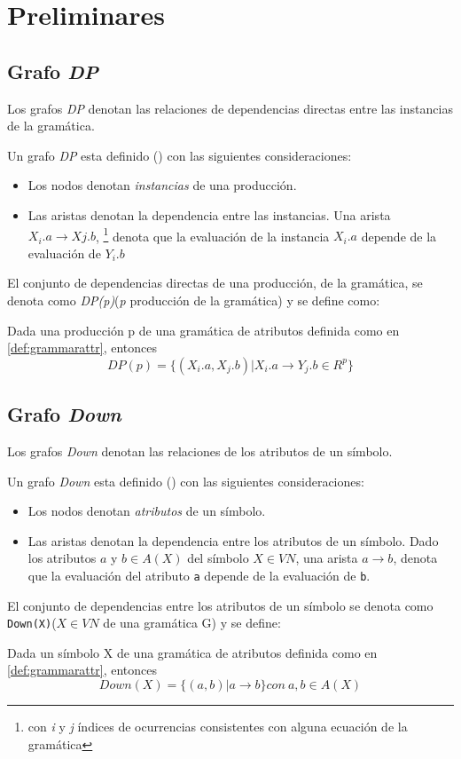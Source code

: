 \section{Preliminares}
\label{sec:pre-grafos}
\subsection{Grafo \textit{DP}}
Los grafos \textit{DP} denotan las relaciones de dependencias directas entre las instancias de la gramática. 

Un grafo \textit{DP} esta definido (\cite{estruc-algorit}) con las siguientes consideraciones: 

\begin{itemize}
\item Los nodos denotan \textit{instancias} de una producción.
\item Las aristas denotan la dependencia entre las instancias. Una arista $X_{i}.a\rightarrow X{j}.b$, \footnote{con \textit{i} y \textit{j} índices de ocurrencias consistentes con alguna ecuación de la gramática} denota que la evaluación de la instancia \textit{$X_{i}.a$} depende de la evaluación de \textit{$Y_{i}.b$} 
\end{itemize}

El conjunto de dependencias directas de una producción, de la gramática, se denota como \textit{DP(p)}(\textit{p} producción de la gramática) y se define como:
\begin{definition}
Dada una producción p de una gramática de atributos definida como en \ref{def:grammarattr}, entonces
\begin{equation}
DP(p) = \{(X_{i}.a, X_{j}.b) | X_{i}.a \rightarrow Y_{j}.b \in R^{p} \}
\end{equation}
\end{definition}

\subsection{Grafo \textit{Down}}
Los grafos \textit{Down} denotan las relaciones de los atributos de un símbolo. 

Un grafo \textit{Down} esta definido (\cite{estruc-algorit}) con las siguientes consideraciones: 

\begin{itemize}
\item Los nodos denotan \textit{atributos} de un símbolo.
\item Las aristas denotan la dependencia entre los atributos de un símbolo. Dado los atributos $a$ y $b\in A(X)$ del símbolo $X\in VN$, una arista $a\rightarrow b$, denota que la evaluación del atributo \texttt{a} depende de la evaluación de \texttt{b}. 
\end{itemize}
El conjunto de dependencias entre los atributos de un símbolo se denota como  
\texttt{Down(X)}($X\in VN$ de una gramática G) y se define:
\begin{definition}
Dada un símbolo X de una gramática de atributos definida como en \ref{def:grammarattr}, entonces
\begin{equation}
Down(X) = \{(a,b) | a \rightarrow b \} con\ a,b \in A(X)
\end{equation}
\end{definition}
